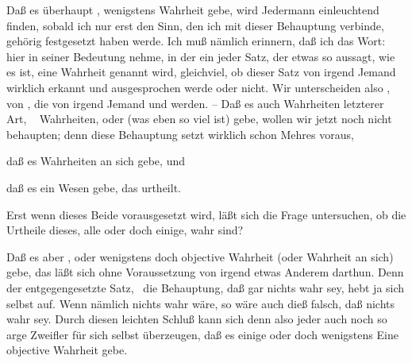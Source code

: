 \begin{aufza}
\item Daß es überhaupt , wenigstens  Wahrheit gebe, wird Jedermann einleuchtend finden, sobald ich nur erst den Sinn, den ich mit dieser Behauptung verbinde, gehörig festgesetzt haben werde. Ich muß nämlich erinnern, daß ich das Wort:  hier in seiner  Bedeutung nehme, in der ein jeder Satz, der etwas so aussagt, wie es ist, eine Wahrheit genannt wird, gleichviel, ob dieser Satz von irgend Jemand wirklich erkannt und ausgesprochen werde oder nicht. Wir unterscheiden also , von , die von irgend Jemand  und  werden. -- Daß es auch Wahrheiten letzterer Art, \dh\  Wahrheiten, oder (was eben so viel ist)  gebe, wollen wir jetzt noch nicht behaupten; denn diese Behauptung setzt wirklich schon Mehres voraus,
\begin{aufzb}
\item daß es Wahrheiten an sich gebe, und
\item daß es ein Wesen gebe, das urtheilt.~
\end{aufzb}
Erst wenn dieses Beide vorausgesetzt wird, läßt sich die Frage untersuchen, ob die Urtheile dieses, alle oder doch einige, wahr sind?
\item Daß es aber , oder wenigstens doch  objective Wahrheit (oder Wahrheit an sich) gebe, das läßt sich ohne Voraussetzung von irgend etwas Anderem darthun. Denn der entgegengesetzte Satz, \dh\ die Behauptung, daß gar nichts wahr sey, hebt ja sich selbst auf. Wenn nämlich nichts wahr wäre, so wäre auch dieß falsch, daß nichts wahr sey. Durch diesen leichten Schluß kann sich denn also jeder auch noch so arge Zweifler für sich selbst überzeugen, daß es einige oder doch wenigstens Eine objective Wahrheit gebe.
\end{aufza}

